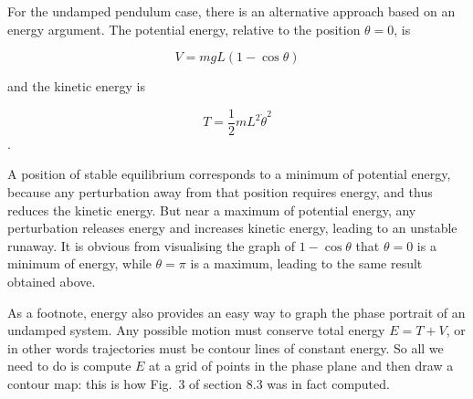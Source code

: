   For the undamped pendulum case, there is an alternative approach based on an 
  energy argument. The potential energy, relative to the position $\theta =0$, 
  is 

  $$V=mgL(1- \cos \theta) \tag{6}$$ 

  and the kinetic energy is 

  $$T=\dfrac{1}{2} m L^2 \dot{\theta}^2 \tag{7}$$. 

  A position of stable equilibrium corresponds to a minimum of potential 
  energy, because any perturbation away from that position requires energy, and 
  thus reduces the kinetic energy. But near a maximum of potential energy, any 
  perturbation releases energy and increases kinetic energy, leading to an 
  unstable runaway. It is obvious from visualising the graph of $1-\cos \theta$ 
  that $\theta = 0$ is a minimum of energy, while $\theta = \pi$ is a maximum, 
  leading to the same result obtained above. 

  As a footnote, energy also provides an easy way to graph the phase portrait 
  of an undamped system. Any possible motion must conserve total energy 
  $E=T+V$, or in other words trajectories must be contour lines of constant 
  energy. So all we need to do is compute $E$ at a grid of points in the phase 
  plane and then draw a contour map: this is how Fig.\ 3 of section 8.3 was in 
  fact computed. 